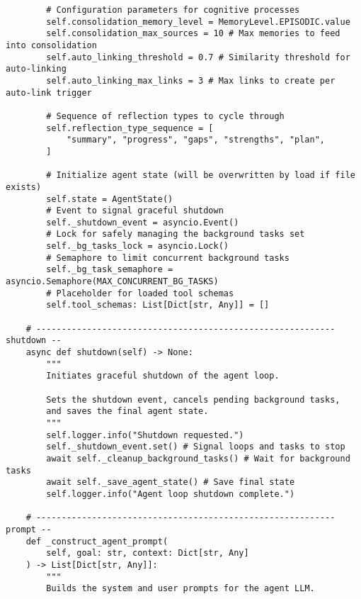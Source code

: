 \documentclass[12pt,a4paper]{article}
\begin{document}
\begin{pageablecode}
\begin{verbatim}
        # Configuration parameters for cognitive processes
        self.consolidation_memory_level = MemoryLevel.EPISODIC.value
        self.consolidation_max_sources = 10 # Max memories to feed into consolidation
        self.auto_linking_threshold = 0.7 # Similarity threshold for auto-linking
        self.auto_linking_max_links = 3 # Max links to create per auto-link trigger

        # Sequence of reflection types to cycle through
        self.reflection_type_sequence = [
            "summary", "progress", "gaps", "strengths", "plan",
        ]

        # Initialize agent state (will be overwritten by load if file exists)
        self.state = AgentState()
        # Event to signal graceful shutdown
        self._shutdown_event = asyncio.Event()
        # Lock for safely managing the background tasks set
        self._bg_tasks_lock = asyncio.Lock()
        # Semaphore to limit concurrent background tasks
        self._bg_task_semaphore = asyncio.Semaphore(MAX_CONCURRENT_BG_TASKS)
        # Placeholder for loaded tool schemas
        self.tool_schemas: List[Dict[str, Any]] = []

    # ----------------------------------------------------------- shutdown --
    async def shutdown(self) -> None:
        """
        Initiates graceful shutdown of the agent loop.

        Sets the shutdown event, cancels pending background tasks,
        and saves the final agent state.
        """
        self.logger.info("Shutdown requested.")
        self._shutdown_event.set() # Signal loops and tasks to stop
        await self._cleanup_background_tasks() # Wait for background tasks
        await self._save_agent_state() # Save final state
        self.logger.info("Agent loop shutdown complete.")

    # ----------------------------------------------------------- prompt --
    def _construct_agent_prompt(
        self, goal: str, context: Dict[str, Any]
    ) -> List[Dict[str, Any]]:
        """
        Builds the system and user prompts for the agent LLM.


\end{verbatim}
\end{pageablecode}
\end{document}
